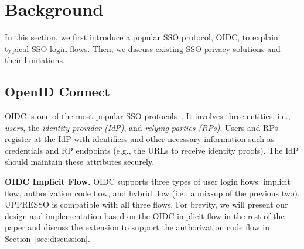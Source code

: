 \section{Background}
\label{sec:background}
In this section, we first introduce a popular SSO protocol, OIDC, to explain typical SSO login flows. Then, we discuss existing SSO privacy solutions and their limitations.

\subsection{OpenID Connect}
\label{subsec:OIDC}
OIDC is one of the most popular SSO protocols~\cite{OpenIDConnect}. %
It involves three entities, i.e., {\em users}, the {\em identity provider (IdP)}, and {\em relying parties (RPs)}.
Users and RPs register at the IdP with identifiers %
and other necessary information such as credentials and RP endpoints (e.g., the URLs to receive identity proofs).
The IdP should maintain these attributes securely.

\vspace{0.5mm}
\noindent\textbf{OIDC Implicit Flow.}
OIDC supports three types of user login flows: implicit flow, authorization code flow, and hybrid flow (i.e., a mix-up of the previous two).
UPPRESSO is compatible with all three flows. For brevity, we will present our design and implementation based on the OIDC implicit flow in the rest of the paper and discuss the extension to support the authorization code flow in Section~\ref{sec:discussion}.

